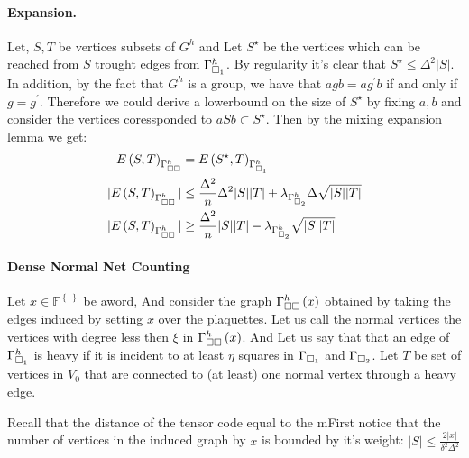\documentclass{article}
\begin{document}
\begin{multicols*}{2}
	\paragraph{Expansion.} Let, $S , T$ be vertices subsets of $G^{h}$ and Let $S^{\star}$ be the vertices which can be reached from $S$ trought edges from $\Gamma_{\square_{1}}^{h}$. By regularity it's clear that $S^{\star}\le \Delta^{2}|S|$. In addition, by the fact that $G^{h}$ is a group, we have that $agb = ag^{\prime}b$ if and only if $g = g^{\prime}$. 
	Therefore we could derive a lowerbound on the size of $S^{\star}$ by fixing $a,b$ and consider the vertices coressponded to $aSb \subset S^{\star}$.    
	Then by the mixing expansion lemma we get: 
	\begin{equation*}
	  \begin{split}
	  E\left( S,T \right)_{\Gamma_{\square \square }^{h}} &= E\left( S^{\star}, T  \right)_{\Gamma_{\square_{1}}^{h}} \\
	|E\left( S,T \right)_{\Gamma_{\square \square }^{h}}| &\le \frac{\Delta^{2}}{n}\Delta^{2}|S||T| + \lambda_{\Gamma_{\square_{2}}^{h}}\Delta\sqrt{|S||T|} \\ 
      |E\left( S,T \right)_{\Gamma_{\square \square }^{h}}| &\ge \frac{\Delta^{2}}{n}|S||T| - \lambda_{\Gamma_{\square_{2}}^{h}}\sqrt{|S||T|}  
	  \end{split}
	\end{equation*}
	\paragraph{Dense Normal Net Counting} Let $x \in \mathbb{F}^{\left\{ \cdot \right\}}  $ be aword, And consider the graph $\Gamma_{\square \square }^{h}\left( x \right)$  obtained by taking the edges induced by setting $x$ over the plaquettes.  
	Let us call the normal vertices the vertices with degree less then $\xi$ in $\Gamma_{\square \square }^{h}\left( x \right)$.  
    And Let us say that that an edge of $\Gamma_{\square_{1}}^{h}$ is heavy if it is incident to at least $\eta$ squares in $\Gamma_{\square_{1}}$ and $\Gamma_{\square_{2}}$. Let $ T$ be set of vertices in $V_0$ that are connected to (at least) one normal vertex through a heavy edge. 

    Recall that the distance of the tensor code equal to the mFirst notice that the number of vertices in the induced graph by $x$ is bounded by it's weight:
    $ |S| \le \frac{2|x|}{ \delta^{2}\Delta^{2} }$ 


\end{multicols*}
\end{document}
